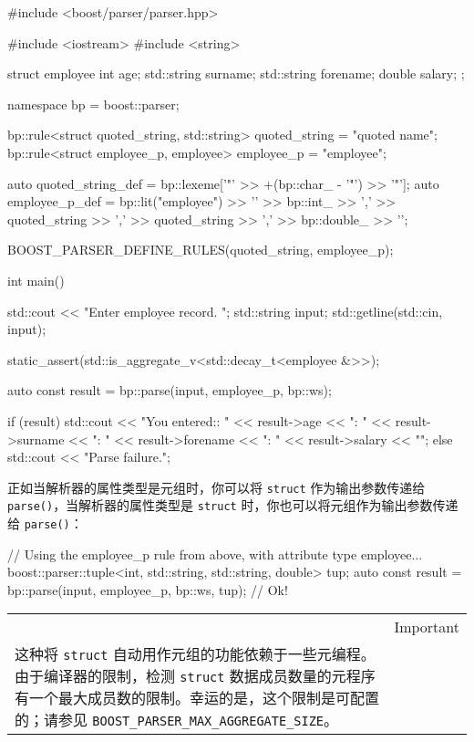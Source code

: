 \begin{code}
#include <boost/parser/parser.hpp>

#include <iostream>
#include <string>


struct employee
{
    int age;
    std::string surname;
    std::string forename;
    double salary;
};

namespace bp = boost::parser;

bp::rule<struct quoted_string, std::string> quoted_string = "quoted name";
bp::rule<struct employee_p, employee> employee_p = "employee";

auto quoted_string_def = bp::lexeme['"' >> +(bp::char_ - '"') >> '"'];
auto employee_p_def = bp::lit("employee")
    >> '{'
    >> bp::int_ >> ','
    >> quoted_string >> ','
    >> quoted_string >> ','
    >> bp::double_
    >> '}';

BOOST_PARSER_DEFINE_RULES(quoted_string, employee_p);

int main()
{
    std::cout << "Enter employee record. ";
    std::string input;
    std::getline(std::cin, input);

    static_assert(std::is_aggregate_v<std::decay_t<employee &>>);

    auto const result = bp::parse(input, employee_p, bp::ws);

    if (result) {
        std::cout << "You entered:\nage:      " << result->age
                  << "\nsurname:  " << result->surname
                  << "\nforename: " << result->forename
                  << "\nsalary  : " << result->salary << "\n";
    } else {
        std::cout << "Parse failure.\n";
    }
}
\end{code}

正如当解析器的属性类型是元组时，你可以将 \texttt{struct} 作为输出参数传递给 \texttt{parse()}，当解析器的属性类型是 \texttt{struct} 时，你也可以将元组作为输出参数传递给 \texttt{parse()}：

\begin{code}
// Using the employee_p rule from above, with attribute type employee...
boost::parser::tuple<int, std::string, std::string, double> tup;
auto const result = bp::parse(input, employee_p, bp::ws, tup); // Ok!
\end{code}

\begin{longtable}[]{@{}
  >{\raggedright\arraybackslash}p{}
  >{\raggedright\arraybackslash}p{}@{}}
\toprule\noalign{}
\endhead
\bottomrule\noalign{}
\endlastfoot
\begin{minipage}[t]{\linewidth}\raggedright
\end{minipage} & Important \\
这种将 \texttt{struct} 自动用作元组的功能依赖于一些元编程。由于编译器的限制，检测 \texttt{struct} 数据成员数量的元程序有一个最大成员数的限制。幸运的是，这个限制是可配置的；请参见 \texttt{BOOST\_PARSER\_MAX\_AGGREGATE\_SIZE}。 & \\
\end{longtable}

